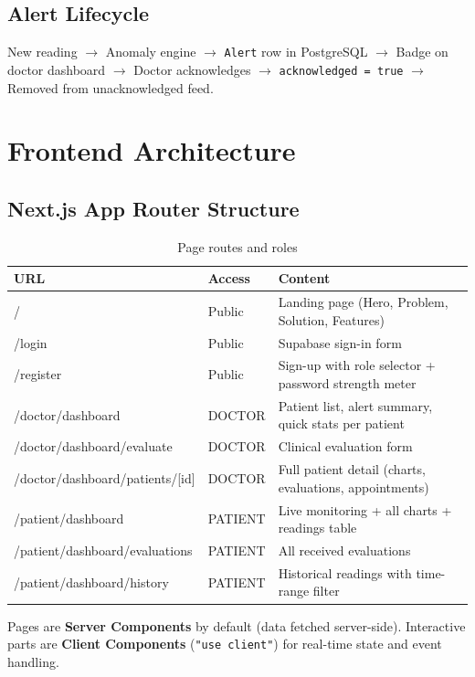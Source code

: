 \documentclass[12pt,a4paper]{report}
\begin{document}
\section{Alert Lifecycle}

New reading $\to$ Anomaly engine $\to$ \texttt{Alert} row in PostgreSQL $\to$ Badge on doctor dashboard $\to$ Doctor acknowledges $\to$ \texttt{acknowledged = true} $\to$ Removed from unacknowledged feed.

\chapter{Frontend Architecture}

\section{Next.js App Router Structure}

\begin{table}[H]\centering\renewcommand{\arraystretch}{1.4}
\begin{tabularx}{\linewidth}{>{\ttfamily\small}l l X}
\toprule
URL & Access & Content \\
\midrule
/ & Public & Landing page (Hero, Problem, Solution, Features) \\
/login & Public & Supabase sign-in form \\
/register & Public & Sign-up with role selector + password strength meter \\
/doctor/dashboard & DOCTOR & Patient list, alert summary, quick stats per patient \\
/doctor/dashboard/evaluate & DOCTOR & Clinical evaluation form \\
/doctor/dashboard/patients/[id] & DOCTOR & Full patient detail (charts, evaluations, appointments) \\
/patient/dashboard & PATIENT & Live monitoring + all charts + readings table \\
/patient/dashboard/evaluations & PATIENT & All received evaluations \\
/patient/dashboard/history & PATIENT & Historical readings with time-range filter \\
\bottomrule
\end{tabularx}
\caption{Page routes and roles}
\end{table}

Pages are \textbf{Server Components} by default (data fetched server-side). Interactive parts are \textbf{Client Components} (\texttt{"use client"}) for real-time state and event handling.
\end{document}
